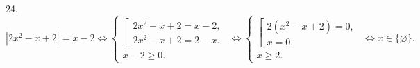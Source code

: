 24. $|2x^2-x+2|=x-2\Leftrightarrow \begin{cases} \left[\begin{array}{l}2x^2-x+2=x-2,\\ 2x^2-x+2=2-x.\end{array}\right.\\ x-2\geqslant0.\end{cases}
\Leftrightarrow \begin{cases} \left[\begin{array}{l}2(x^2-x+2)=0,\\ x=0.\end{array}\right.\\ x\geqslant2.\end{cases}\Leftrightarrow x\in\{\varnothing\}.$\\
